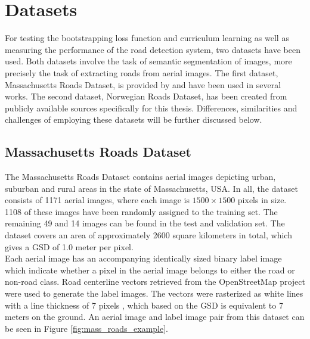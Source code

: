 \section{Datasets}
\label{sec:datasets}
For testing the bootstrapping loss function and curriculum learning as well as measuring the performance of the road detection system, two datasets have been used. Both datasets involve the task of semantic segmentation of images, more precisely the task of extracting roads from aerial images. The first dataset, Massachusetts Roads Dataset, is provided by \cite{MnihThesis} and have been used in several works. The second dataset, Norwegian Roads Dataset, has been created from publicly available sources specifically for this thesis. Differences, similarities and challenges of employing these datasets will be further discussed below.\\

\subsection{Massachusetts Roads Dataset}
The Massachusetts Roads Dataset contains aerial images depicting urban, suburban and rural areas in the state of Massachusetts, USA. In all, the dataset consists of 1171 aerial images, where each image is $1500\times 1500$ pixels in size. 1108 of these images have been randomly assigned to the training set. The remaining 49 and 14 images can be found in the test and validation set. The dataset covers an area of approximately 2600 square kilometers in total, which gives a \ac{GSD} of 1.0 meter per pixel.\\

Each aerial image has an accompanying identically sized binary label image which indicate whether a pixel in the aerial image belongs to either the road or non-road class. Road centerline vectors retrieved from the OpenStreetMap project were used to generate the label images. The vectors were rasterized as white lines with a line thickness of 7 pixels \citep{MnihThesis}, which based on the \ac{GSD} is equivalent to 7 meters on the ground. An aerial image and label image pair from this dataset can be seen in Figure \ref{fig:mass_roads_example}.\\

